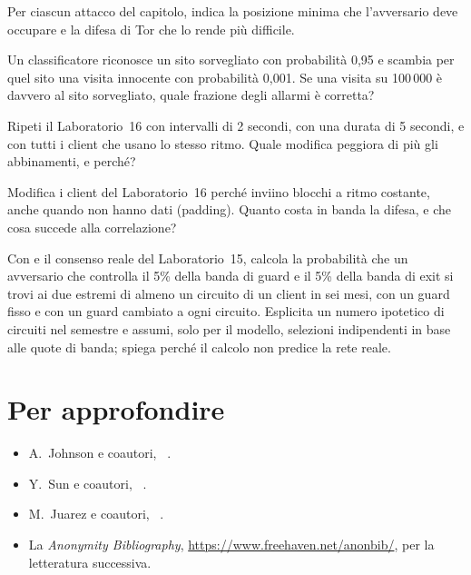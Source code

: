 \begin{esercizio}[1]\label{es:26-posizione}
Per ciascun attacco del capitolo, indica la posizione minima che l'avversario deve occupare e la difesa di Tor che lo rende più difficile.
\end{esercizio}

\begin{esercizio}[1]\label{es:26-base}
Un classificatore riconosce un sito sorvegliato con probabilità 0,95 e scambia per quel sito una visita innocente con probabilità 0,001. Se una visita su 100\,000 è davvero al sito sorvegliato, quale frazione degli allarmi è corretta?
\end{esercizio}

\begin{esercizio}[2]\label{es:26-bin}
Ripeti il Laboratorio~16 con intervalli di 2 secondi, con una durata di 5 secondi, e con tutti i client che usano lo stesso ritmo. Quale modifica peggiora di più gli abbinamenti, e perché?
\end{esercizio}

\begin{esercizio}[2]\label{es:26-difesa}
Modifica i client del Laboratorio~16 perché inviino blocchi a ritmo costante, anche quando non hanno dati (padding). Quanto costa in banda la difesa, e che cosa succede alla correlazione?
\end{esercizio}

\begin{esercizio}[3]\label{es:26-probabilita}
Con  e il consenso reale del Laboratorio~15, calcola la probabilità che un avversario che controlla il 5\% della banda di guard e il 5\% della banda di exit si trovi ai due estremi di almeno un circuito di un client in sei mesi, con un guard fisso e con un guard cambiato a ogni circuito. Esplicita un numero ipotetico di circuiti nel semestre e assumi, solo per il modello, selezioni indipendenti in base alle quote di banda; spiega perché il calcolo non predice la rete reale.
\end{esercizio}

\section*{Per approfondire}
\begin{itemize}
  \item A.~Johnson e coautori, ~\cite{johnson2013users}.
  \item Y.~Sun e coautori, ~\cite{sun2015raptor}.
  \item M.~Juarez e coautori, ~\cite{juarez2014critical}.
  \item La \emph{Anonymity Bibliography}, \url{https://www.freehaven.net/anonbib/}, per la letteratura successiva.
\end{itemize}
